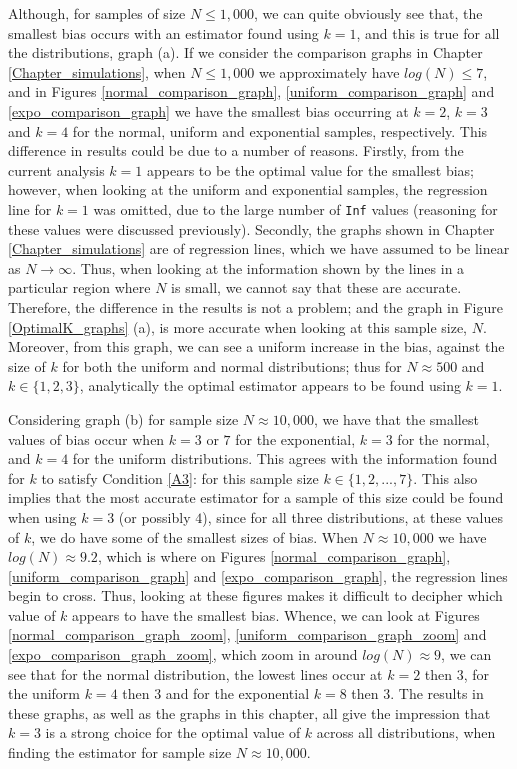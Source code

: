 \documentclass[12pt]{report}
\begin{document}
Although, for samples of size $N \leq 1,000$, we can quite obviously see that, the smallest bias occurs with an estimator found using $k=1$, and this is true for all the distributions, graph (a). If we consider the comparison graphs in Chapter \ref{Chapter_simulations}, when $N \leq 1,000$ we approximately have $log(N) \leq 7$, and in Figures \ref{normal_comparison_graph}, \ref{uniform_comparison_graph} and \ref{expo_comparison_graph} we have the smallest bias occurring at $k=2$, $k=3$ and $k=4$ for the normal, uniform and exponential samples, respectively. This difference in results could be due to a number of reasons. Firstly, from the current analysis $k=1$ appears to be the optimal value for the smallest bias; however, when looking at the uniform and exponential samples, the regression line for $k=1$ was omitted, due to the large number of \texttt{Inf} values (reasoning for these values were discussed previously). Secondly, the graphs shown in Chapter \ref{Chapter_simulations} are of regression lines, which we have assumed to be linear as $N \to \infty$. Thus, when looking at the information shown by the lines in a particular region where $N$ is small, we cannot say that these are accurate. Therefore, the difference in the results is not a problem; and the graph in Figure \ref{OptimalK_graphs} (a), is more accurate when looking at this sample size, $N$. Moreover, from this graph, we can see a uniform increase in the bias, against the size of $k$ for both the uniform and normal distributions; thus for $N \approx 500$ and $k \in \{1,2, 3\}$, analytically the optimal estimator appears to be found using $k=1$. 


Considering graph (b) for sample size $N \approx 10,000$, we have that the smallest values of bias occur when $k=3$ or $7$ for the exponential, $k=3$ for the normal, and $k=4$ for the uniform distributions. This agrees with the information found for $k$ to satisfy Condition \ref{A3}: for this sample size $k \in \{1, 2, ... , 7\}$. This also implies that the most accurate estimator for a sample of this size could be found when using $k =3$ (or possibly $4$), since for all three distributions, at these values of $k$, we do have some of the smallest sizes of bias. When $N \approx 10,000$ we have $log(N) \approx 9.2$, which is where on Figures  \ref{normal_comparison_graph}, \ref{uniform_comparison_graph} and \ref{expo_comparison_graph}, the regression lines begin to cross. Thus, looking at these figures makes it difficult to decipher which value of $k$ appears to have the smallest bias. Whence, we can look at  Figures \ref{normal_comparison_graph_zoom}, \ref{uniform_comparison_graph_zoom} and \ref{expo_comparison_graph_zoom}, which zoom in around $log(N) \approx 9$, we can see that for the normal distribution, the lowest lines occur at $k=2$ then $3$, for the uniform $k=4$ then $3$ and for the exponential $k=8$ then $3$. The results in these graphs, as well as the graphs in this chapter, all give the impression that $k=3$ is a strong choice for the optimal value of $k$ across all distributions, when finding the estimator for sample size $N \approx 10,000$.
\end{document}
